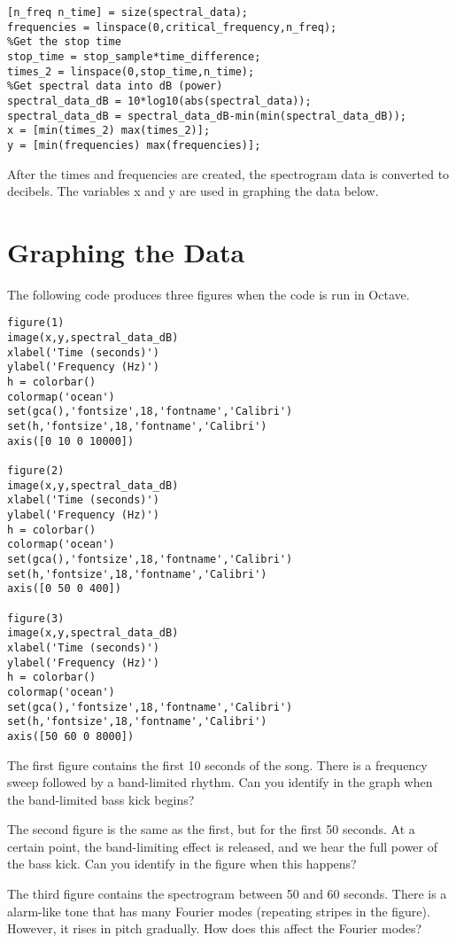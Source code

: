 \documentclass[12pt]{article}
\begin{document}
\begin{verbatim}
[n_freq n_time] = size(spectral_data);
frequencies = linspace(0,critical_frequency,n_freq);
%Get the stop time
stop_time = stop_sample*time_difference;
times_2 = linspace(0,stop_time,n_time);
%Get spectral data into dB (power)
spectral_data_dB = 10*log10(abs(spectral_data));
spectral_data_dB = spectral_data_dB-min(min(spectral_data_dB));
x = [min(times_2) max(times_2)];
y = [min(frequencies) max(frequencies)];
\end{verbatim}

After the times and frequencies are created, the spectrogram data is converted to decibels.  The variables x and y are used in graphing the data below.

\section{Graphing the Data}

The following code produces three figures when the code is run in Octave.

\begin{verbatim}
figure(1)
image(x,y,spectral_data_dB)
xlabel('Time (seconds)')
ylabel('Frequency (Hz)')
h = colorbar()
colormap('ocean')
set(gca(),'fontsize',18,'fontname','Calibri')
set(h,'fontsize',18,'fontname','Calibri')
axis([0 10 0 10000])

figure(2)
image(x,y,spectral_data_dB)
xlabel('Time (seconds)')
ylabel('Frequency (Hz)')
h = colorbar()
colormap('ocean')
set(gca(),'fontsize',18,'fontname','Calibri')
set(h,'fontsize',18,'fontname','Calibri')
axis([0 50 0 400])

figure(3)
image(x,y,spectral_data_dB)
xlabel('Time (seconds)')
ylabel('Frequency (Hz)')
h = colorbar()
colormap('ocean')
set(gca(),'fontsize',18,'fontname','Calibri')
set(h,'fontsize',18,'fontname','Calibri')
axis([50 60 0 8000])
\end{verbatim}

The first figure contains the first 10 seconds of the song.  There is a frequency sweep followed by a band-limited rhythm.  Can you identify in the graph when the band-limited bass kick begins?

The second figure is the same as the first, but for the first 50 seconds.  At a certain point, the band-limiting effect is released, and we hear the full power of the bass kick.  Can you identify in the figure when this happens?

The third figure contains the spectrogram between 50 and 60 seconds.  There is a alarm-like tone that has many Fourier modes (repeating stripes in the figure).  However, it rises in pitch gradually.  How does this affect the Fourier modes?
\end{document}
